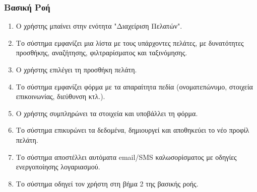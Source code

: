 \documentclass[12pt,a4paper,twoside]{book}
\begin{document}
\subsubsection{Βασική Ροή}
\begin{enumerate}
  \item Ο χρήστης μπαίνει στην ενότητα "Διαχείριση Πελατών".
  \item Το σύστημα εμφανίζει μια λίστα με τους υπάρχοντες πελάτες, με δυνατότητες προσθήκης, αναζήτησης, φιλτραρίσματος και ταξινόμησης.
  \item Ο χρήστης επιλέγει τη προσθήκη πελάτη.
  \item Το σύστημα εμφανίζει φόρμα με τα απαραίτητα πεδία (ονοματεπώνυμο, στοιχεία επικοινωνίας, διεύθυνση κτλ.).
  \item Ο χρήστης συμπληρώνει τα στοιχεία και υποβάλλει τη φόρμα.
  \item Το σύστημα επικυρώνει τα δεδομένα, δημιουργεί και αποθηκεύει το νέο προφίλ πελάτη.
  \item Το σύστημα αποστέλλει αυτόματα email/SMS καλωσορίσματος με οδηγίες ενεργοποίησης λογαριασμού.
  \item Το σύστημα οδηγεί τον χρήστη στη βήμα 2 της βασικής ροής.
\end{enumerate}
\end{document}
